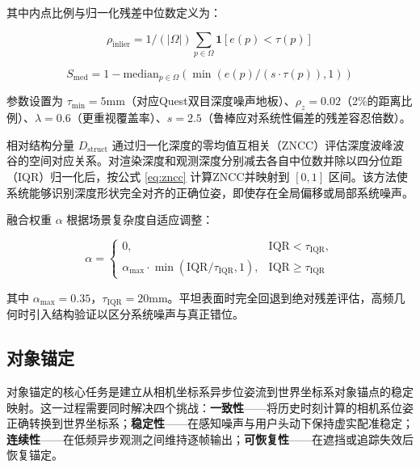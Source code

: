 \documentclass[9pt,twocolumn,letterpaper]{extarticle}
\begin{document}
其中内点比例与归一化残差中位数定义为：

\begin{equation}
\rho_{\mathrm{inlier}} = 1/(\lvert \Omega \rvert) \sum_{p \in \Omega} \mathbf{1}[e(p) < \tau(p)]
\end{equation}


\begin{equation}
S_{\mathrm{med}} = 1 - \mathrm{median}_{p \in \Omega} (\min\!\left(e(p)/(s \cdot \tau(p)), 1\right))
\label{eq:depth-stats}
\end{equation}


参数设置为 $\tau_{\mathrm{min}} = 5 \mathrm{mm}$（对应Quest双目深度噪声地板）、$\rho_z = 0.02$（2\%的距离比例）、$\lambda = 0.6$（更重视覆盖率）、$s = 2.5$（鲁棒应对系统性偏差的残差容忍倍数）。

相对结构分量 $D_{\mathrm{struct}}$ 通过归一化深度的零均值互相关（ZNCC）评估深度波峰波谷的空间对应关系。对渲染深度和观测深度分别减去各自中位数并除以四分位距（IQR）归一化后，按公式 \ref{eq:zncc} 计算ZNCC并映射到 $[0,1]$ 区间。该方法使系统能够识别深度形状完全对齐的正确位姿，即使存在全局偏移或局部系统噪声。

融合权重 $\alpha$ 根据场景复杂度自适应调整：

\begin{equation}
\alpha = \begin{cases}
0, & \mathrm{IQR} < \tau_{\mathrm{IQR}}, \\
\alpha_{\mathrm{max}} \cdot \min\!\left(\mathrm{IQR}/\tau_{\mathrm{IQR}}, 1\right), & \mathrm{IQR} \geq \tau_{\mathrm{IQR}}
\end{cases}
\label{eq:depth-alpha}
\end{equation}


其中 $\alpha_{\mathrm{max}} = 0.35$，$\tau_{\mathrm{IQR}} = 20 \mathrm{mm}$。平坦表面时完全回退到绝对残差评估，高频几何时引入结构验证以区分系统噪声与真正错位。

\subsection{对象锚定}\label{sec:anchoring}


对象锚定的核心任务是建立从相机坐标系异步位姿流到世界坐标系对象锚点的稳定映射。这一过程需要同时解决四个挑战：\textbf{一致性}------将历史时刻计算的相机系位姿正确转换到世界坐标系；\textbf{稳定性}------在感知噪声与用户头动下保持虚实配准稳定；\textbf{连续性}------在低频异步观测之间维持逐帧输出；\textbf{可恢复性}------在遮挡或追踪失效后恢复锚定。
\end{document}
